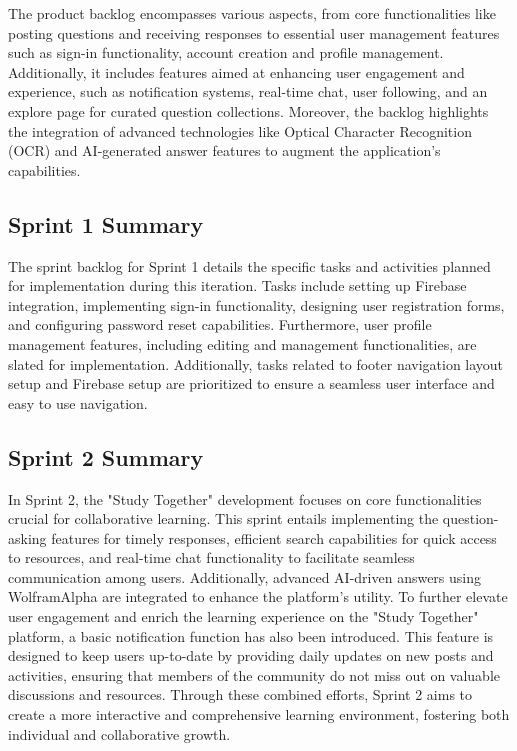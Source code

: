 The product backlog encompasses various aspects, from core functionalities like posting questions and receiving responses to essential user management features such as sign-in functionality, account creation and profile management. Additionally, it includes features aimed at enhancing user engagement and experience, such as notification systems, real-time chat, user following, and an explore page for curated question collections. Moreover, the backlog highlights the integration of advanced technologies like Optical Character Recognition (OCR) and AI-generated answer features to augment the application's capabilities.

\subsection{Sprint 1 Summary}
The sprint backlog for Sprint 1 details the specific tasks and activities planned for implementation during this iteration. Tasks include setting up Firebase integration, implementing sign-in functionality, designing user registration forms, and configuring password reset capabilities. Furthermore, user profile management features, including editing and management functionalities, are slated for implementation. Additionally, tasks related to footer navigation layout setup and Firebase setup are prioritized to ensure a seamless user interface and easy to use navigation.

\subsection{Sprint 2 Summary}
In Sprint 2, the "Study Together" development focuses on core functionalities crucial for collaborative learning. This sprint entails implementing the question-asking features for timely responses, efficient search capabilities for quick access to resources, and real-time chat functionality to facilitate seamless communication among users. Additionally, advanced AI-driven answers using WolframAlpha are integrated to enhance the platform's utility. To further elevate user engagement and enrich the learning experience on the "Study Together" platform, a basic notification function has also been introduced. This feature is designed to keep users up-to-date by providing daily updates on new posts and activities, ensuring that members of the community do not miss out on valuable discussions and resources. Through these combined efforts, Sprint 2 aims to create a more interactive and comprehensive learning environment, fostering both individual and collaborative growth.

